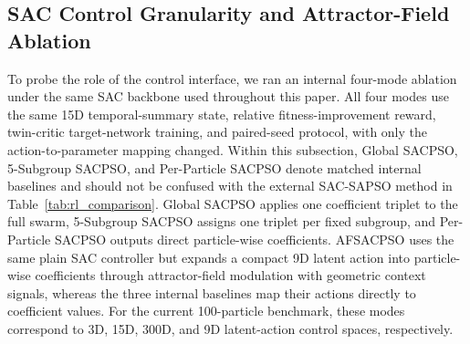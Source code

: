 \documentclass[final,5p,times]{elsarticle}
\begin{document}
\subsection{SAC Control Granularity and Attractor-Field Ablation}
\label{subsec:sac_granularity_ablation_results}
To probe the role of the control interface, we ran an internal four-mode ablation under the same SAC backbone used throughout this paper.
All four modes use the same 15D temporal-summary state, relative fitness-improvement reward, twin-critic target-network training, and paired-seed protocol, with only the action-to-parameter mapping changed.
Within this subsection, Global SACPSO, 5-Subgroup SACPSO, and Per-Particle SACPSO denote matched internal baselines and should not be confused with the external SAC-SAPSO method in Table~\ref{tab:rl_comparison}.
Global SACPSO applies one coefficient triplet to the full swarm, 5-Subgroup SACPSO assigns one triplet per fixed subgroup, and Per-Particle SACPSO outputs direct particle-wise coefficients.
AFSACPSO uses the same plain SAC controller but expands a compact 9D latent action into particle-wise coefficients through attractor-field modulation with geometric context signals, whereas the three internal baselines map their actions directly to coefficient values.
For the current 100-particle benchmark, these modes correspond to 3D, 15D, 300D, and 9D latent-action control spaces, respectively.
\end{document}

